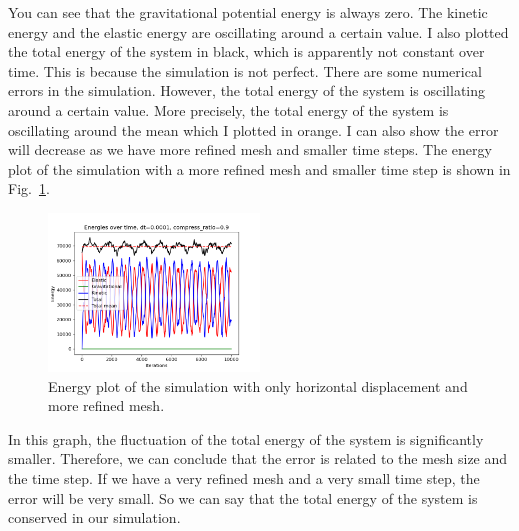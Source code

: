\documentclass[acmtog]{acmart}
\begin{document}
You can see that the gravitational potential energy is always zero. The kinetic energy and the elastic energy are oscillating around a certain value. I also plotted the total energy of the system in black, which is apparently not constant over time. This is because the simulation is not perfect. There are some numerical errors in the simulation. However, the total energy of the system is oscillating around a certain value. More precisely, the total energy of the system is oscillating around the mean which I plotted in orange. I can also show the error will decrease as we have more refined mesh and smaller time steps. The energy plot of the simulation with a more refined mesh and smaller time step is shown in Fig.~\ref{fig:godly2}.

\begin{figure}[H]
  \centering
  \includegraphics[width=0.5\textwidth]{images/godly2.png}
  \caption{Energy plot of the simulation with only horizontal displacement and more refined mesh.}
  \label{fig:godly2}
\end{figure}

In this graph, the fluctuation of the total energy of the system is significantly smaller. Therefore, we can conclude that the error is related to the mesh size and the time step. If we have a very refined mesh and a very small time step, the error will be very small. So we can say that the total energy of the system is conserved in our simulation.
\end{document}
